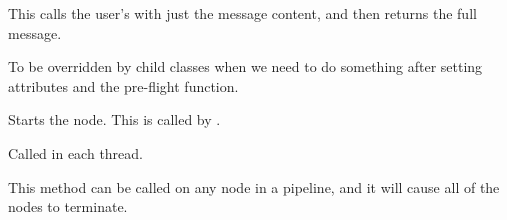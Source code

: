 \documentclass[letterpaper,10pt,english]{sphinxmanual}
\begin{document}
\begin{fulllineitems}
\begin{fulllineitems}
\end{fulllineitems}


\begin{fulllineitems}
\label{\detokenize{api:nanostream.node.NanoNode.processor}}
This calls the user’s  with just the message content,
and then returns the full message.

\end{fulllineitems}


\begin{fulllineitems}
\label{\detokenize{api:nanostream.node.NanoNode.setup}}
To be overridden by child classes when we need to do something
after setting attributes and the pre-flight function.

\end{fulllineitems}


\begin{fulllineitems}
\label{\detokenize{api:nanostream.node.NanoNode.start}}
Starts the node. This is called by .

\end{fulllineitems}


\begin{fulllineitems}
\label{\detokenize{api:nanostream.node.NanoNode.stream}}
Called in each  thread.

\end{fulllineitems}


\begin{fulllineitems}
\label{\detokenize{api:nanostream.node.NanoNode.terminate_pipeline}}
This method can be called on any node in a pipeline, and it will cause
all of the nodes to terminate.


\end{fulllineitems}
\end{fulllineitems}
\end{document}
